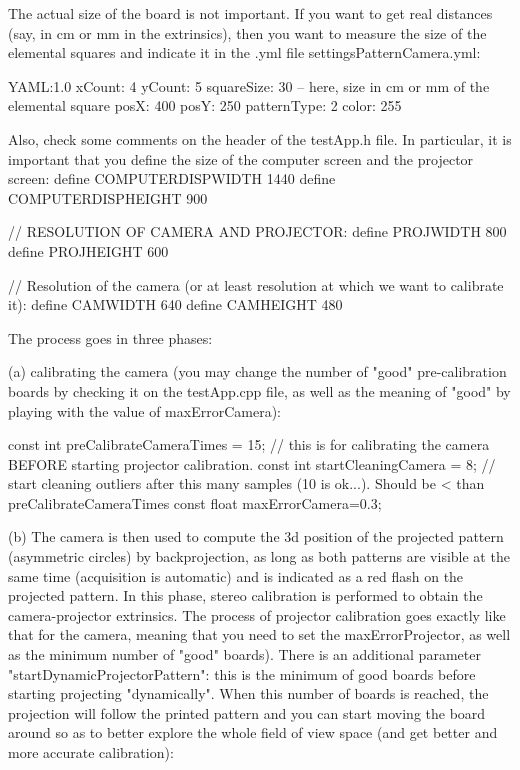 The actual size of the board is not important. If you want to get real distances (say, in cm or mm in the extrinsics), then you want to measure the size of the elemental squares and indicate it in the .yml file settingsPatternCamera.yml:

YAML:1.0 xCount: 4 yCount: 5 squareSize: 30 -- here, size in cm or mm of the elemental square posX: 400 posY: 250 patternType: 2 color: 255

Also, check some comments on the header of the testApp.h file. In particular, it is important that you define the size of the computer screen and the projector screen:
define COMPUTERDISPWIDTH 1440
define COMPUTERDISPHEIGHT 900

// RESOLUTION OF CAMERA AND PROJECTOR:
define PROJWIDTH 800
define PROJHEIGHT 600

// Resolution of the camera (or at least resolution at which we want to calibrate it):
define CAMWIDTH 640
define CAMHEIGHT 480

The process goes in three phases:

(a) calibrating the camera (you may change the number of "good" pre-calibration boards by checking it on the testApp.cpp file, as well as the meaning of "good" by playing with the value of maxErrorCamera):

const int preCalibrateCameraTimes = 15; // this is for calibrating the camera BEFORE starting projector calibration. const int startCleaningCamera = 8; // start cleaning outliers after this many samples (10 is ok...). Should be < than preCalibrateCameraTimes const float maxErrorCamera=0.3;

(b) The camera is then used to compute the 3d position of the projected pattern (asymmetric circles) by backprojection, as long as both patterns are visible at the same time (acquisition is automatic) and is indicated as a red flash on the projected pattern. In this phase, stereo calibration is performed to obtain the camera-projector extrinsics. The process of projector calibration goes exactly like that for the camera, meaning that you need to set the maxErrorProjector, as well as the minimum number of "good" boards). There is an additional parameter "startDynamicProjectorPattern": this is the minimum of good boards before starting projecting "dynamically". When this number of boards is reached, the projection will follow the printed pattern and you can start moving the board around so as to better explore the whole field of view space (and get better and more accurate calibration):

